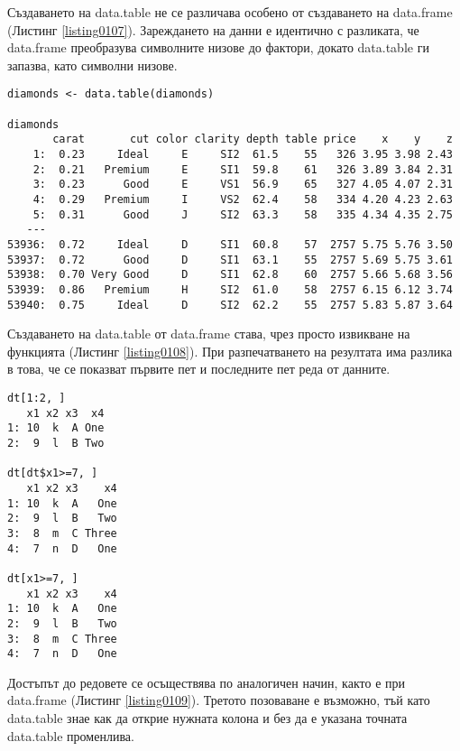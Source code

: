 Създаването на data.table не се различава особено от създаването на data.frame (Листинг \ref{listing0107}). Зареждането на данни е идентично с разликата, че data.frame преобразува символните низове до фактори, докато data.table ги запазва, като символни низове. 

\begin{lstlisting}[caption=Зареждане на data.table от data.frame, label=listing0108]
diamonds <- data.table(diamonds)
 
diamonds
       carat       cut color clarity depth table price    x    y    z
    1:  0.23     Ideal     E     SI2  61.5    55   326 3.95 3.98 2.43
    2:  0.21   Premium     E     SI1  59.8    61   326 3.89 3.84 2.31
    3:  0.23      Good     E     VS1  56.9    65   327 4.05 4.07 2.31
    4:  0.29   Premium     I     VS2  62.4    58   334 4.20 4.23 2.63
    5:  0.31      Good     J     SI2  63.3    58   335 4.34 4.35 2.75
   ---                                                               
53936:  0.72     Ideal     D     SI1  60.8    57  2757 5.75 5.76 3.50
53937:  0.72      Good     D     SI1  63.1    55  2757 5.69 5.75 3.61
53938:  0.70 Very Good     D     SI1  62.8    60  2757 5.66 5.68 3.56
53939:  0.86   Premium     H     SI2  61.0    58  2757 6.15 6.12 3.74
53940:  0.75     Ideal     D     SI2  62.2    55  2757 5.83 5.87 3.64
\end{lstlisting}

Създаването на data.table от data.frame става, чрез просто извикване на функцията (Листинг \ref{listing0108}). При разпечатването на резултата има разлика в това, че се показват първите пет и последните пет реда от данните. 

\begin{lstlisting}[caption=Достъп до редовете, label=listing0109]
dt[1:2, ]
   x1 x2 x3  x4
1: 10  k  A One
2:  9  l  B Two

dt[dt$x1>=7, ]
   x1 x2 x3    x4
1: 10  k  A   One
2:  9  l  B   Two
3:  8  m  C Three
4:  7  n  D   One

dt[x1>=7, ]
   x1 x2 x3    x4
1: 10  k  A   One
2:  9  l  B   Two
3:  8  m  C Three
4:  7  n  D   One
\end{lstlisting}

Достъпът до редовете се осъществява по аналогичен начин, както е при data.frame (Листинг \ref{listing0109}). Третото позоваване е възможно, тъй като data.table знае как да открие нужната колона и без да е указана точната data.table променлива. 

